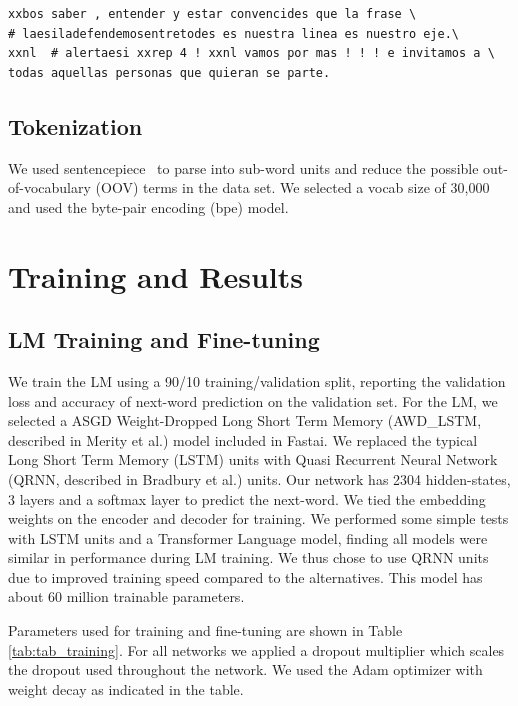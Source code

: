 \documentclass[runningheads]{llncs}
\begin{document}
\begin{verbatim} 
xxbos saber , entender y estar convencides que la frase \
# laesiladefendemosentretodes es nuestra linea es nuestro eje.\
xxnl  # alertaesi xxrep 4 ! xxnl vamos por mas ! ! ! e invitamos a \
todas aquellas personas que quieran se parte.
\end{verbatim}

\subsection{Tokenization}
We used sentencepiece~\cite{SentencePiece:DBLP:journals/corr/abs-1808-06226} to parse into sub-word units and reduce the possible out-of-vocabulary (OOV) terms in the data set.  We selected a vocab size of 30,000 and used the byte-pair encoding (bpe) model. 

\section{Training and Results}
\label{sec:4}
\subsection{LM Training and Fine-tuning}
We train the LM using a 90/10 training/validation split, reporting the validation loss and accuracy of next-word prediction on the validation set. For the LM, we selected a ASGD Weight-Dropped Long Short Term Memory (AWD\_LSTM, described in Merity et al.\cite{Merity:DBLP:journals/corr/abs-1708-02182}) model included in Fastai. We replaced the typical Long Short Term Memory (LSTM) units with Quasi Recurrent Neural Network (QRNN, described in Bradbury et al.\cite{Bradbury:DBLP:journals/corr/BradburyMXS16}) units.  Our network has 2304 hidden-states, 3 layers and a softmax layer to predict the next-word.  We tied the embedding weights\cite{WeightTie:DBLP:journals/corr/PressW16} on the encoder and decoder for training.  We performed some simple tests with LSTM units and a Transformer Language model, finding all models were similar in performance during LM training. We thus chose to use QRNN units due to improved training speed compared to the alternatives. This model has about 60 million trainable parameters.  

Parameters used for training and fine-tuning are shown in Table \ref{tab:tab_training}.
For all networks we applied a dropout multiplier which scales the dropout used throughout the network.  We used the Adam optimizer with weight decay as indicated in the table.  
\end{document}
